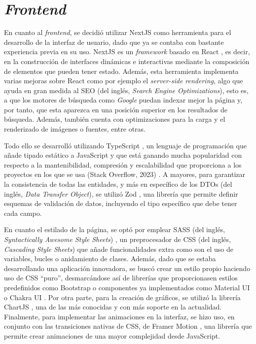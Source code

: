 \section{\textit{Frontend}}
\label{sec:herramientas_frontend}

En cuanto al \textit{frontend}, se decidió utilizar NextJS \cite{nextjs} como herramienta para el desarrollo de la interfaz de usuario, dado que ya
se contaba con bastante experiencia previa en su uso. NextJS es un \textit{framework} basado en React \cite{react}, es decir, en la construcción de interfaces dinámicas e interactivas mediante la composición
de elementos que pueden tener estado. Además, esta herramienta implementa varias mejoras sobre React como por ejemplo el \textit{server-side rendering}, algo que ayuda en gran medida
al SEO (del inglés, \textit{Search Engine Optimizations}), esto es, a que los motores de búsqueda como \textit{Google} puedan indexar mejor la página y, por tanto, que esta aparezca en una posición superior en los resultados de búsqueda.
Además, también cuenta con optimizaciones para la carga y el renderizado de imágenes o fuentes, entre otras.

\bigskip
Todo ello se desarrolló utilizando TypeScript \cite{typescript}, un lenguaje de programación que añade tipado estático a JavaScript
y que está ganando mucha popularidad con respecto a la mantenibilidad, compresión y escalabilidad que proporciona a los proyectos en los que se usa (Stack Overflow, 2023) \cite{stackoverflow2023}.
A mayores, para garantizar la consistencia de todas las entidades, y más en específico de los DTOs (del inglés, \textit{Data Transfer Object}), se utilizó Zod \cite{zod}, una librería que permite
definir esquemas de validación de datos, incluyendo el tipo específico que debe tener cada campo.

\bigskip
En cuanto el estilado de la página, se optó por emplear SASS (del inglés, \textit{Syntactically Awesome Style Sheets}) \cite{sass}, un preprocesador de CSS (del inglés, \textit{Cascading Style Sheets}) que añade
funcionalidades extra como son el uso de variables, bucles o anidamiento de clases. Además, dado que se estaba desarrollando
una aplicación innovadora, se buscó crear un estilo propio haciendo uso de CSS ``puro'', desmarcándose así de librerías que proporcionasen estilos predefinidos como Bootstrap \cite{bootstrap} o componentes ya implementados
como Material UI \cite{materialui} o Chakra UI \cite{chakraui}. Por otra parte, para la creación de gráficos, se utilizó la librería ChartJS \cite{chartjs}, una de las más conocidas
y con más soporte en la actualidad. Finalmente, para implementar las animaciones en la interfaz, se hizo uso, en conjunto con las transiciones nativas
de CSS, de Framer Motion \cite{framermotion}, una librería que permite crear animaciones de una mayor complejidad desde JavaScript.

